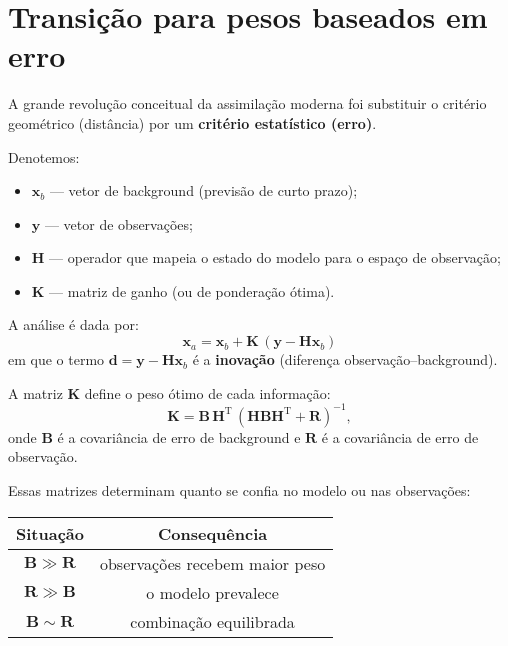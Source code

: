 \section{Transição para pesos baseados em erro}

A grande revolução conceitual da assimilação moderna foi substituir o critério geométrico (distância) por um \textbf{critério estatístico (erro)}.  

Denotemos:
\begin{itemize}
    \item \( \mathbf{x}_b \) --- vetor de background (previsão de curto prazo);
    \item \( \mathbf{y} \) --- vetor de observações;
    \item \( \mathbf{H} \) --- operador que mapeia o estado do modelo para o espaço de observação;
    \item \( \mathbf{K} \) --- matriz de ganho (ou de ponderação ótima).
\end{itemize}

A análise é dada por:
\begin{equation}
\boxed{
\mathbf{x}_a = \mathbf{x}_b + \mathbf{K}\,(\mathbf{y} - \mathbf{H}\mathbf{x}_b)
}
\label{eq:analysis}
\end{equation}
em que o termo \(\mathbf{d} = \mathbf{y} - \mathbf{H}\mathbf{x}_b\) é a \textbf{inovação} (diferença observação--background).

A matriz \(\mathbf{K}\) define o peso ótimo de cada informação:
\begin{equation}
\boxed{
\mathbf{K} = \mathbf{B}\,\mathbf{H}^\mathrm{T}\,
(\mathbf{H}\mathbf{B}\mathbf{H}^\mathrm{T} + \mathbf{R})^{-1}},
\label{eq:kalman_gain}
\end{equation}
onde  
\(\mathbf{B}\) é a covariância de erro de background e  
\(\mathbf{R}\) é a covariância de erro de observação.

Essas matrizes determinam quanto se confia no modelo ou nas observações:

\begin{center}
\begin{tabular}{|c|c|}
\hline
Situação & Consequência \\
\hline
\( \mathbf{B} \gg \mathbf{R} \) & observações recebem maior peso \\
\( \mathbf{R} \gg \mathbf{B} \) & o modelo prevalece \\
\( \mathbf{B} \sim \mathbf{R} \) & combinação equilibrada \\
\hline
\end{tabular}
\end{center}

